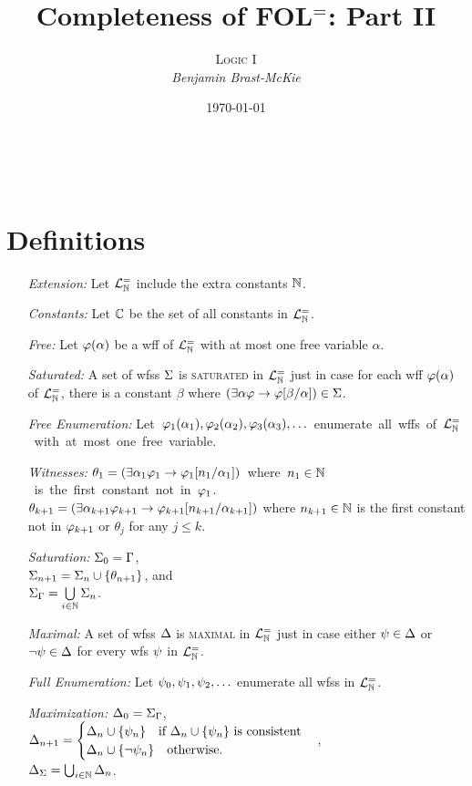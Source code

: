 \documentclass[a4paper, 11pt]{article} %
\title{\textbf{Completeness of FOL$^=$: Part II}} %
\author{\textsc{Logic I}\\ \em Benjamin Brast-McKie} %
\date{\today} %
\makeatletter
\renewcommand{\maketitle}{
\begin{flushright}
{\LARGE\@title}

\vspace{10pt}

{\@author}
\\ \@date
\end{flushright}

\vspace{-20pt}

}
\makeatother
\begin{document}
\maketitle %

\thispagestyle{empty}


\section*{Definitions}

\begin{itemize}
  \item[\it Extension:] Let $\mathcal{L}^{=}_{\mathbb{N}}$ include the extra constants $\mathbb{N}$.
  \item[\it Constants:] Let $\mathbb{C}$ be the set of all constants in $\mathcal{L}^{=}_{\mathbb{N}}$.
  \item[\it Free:] Let $\varphi(\alpha)$ be a wff of $\mathcal{L}^{=}_{\mathbb{N}}$ with at most one free variable $\alpha$.
  \item[\it Saturated:] A set of wfss $\Sigma$ is \textsc{saturated} in $\mathcal{L}^{=}_{\mathbb{N}}$ just in case for each wff $\varphi(\alpha)$ of $\mathcal{L}^{=}_{\mathbb{N}}$, there is a constant $\beta$ where $(\exists \alpha\varphi \rightarrow \varphi[\beta/\alpha])\in\Sigma$.
  \item[\it Free Enumeration:] \mbox{Let $\varphi_1(\alpha_1),\varphi_2(\alpha_2),\varphi_3(\alpha_3),\ldots$ enumerate all wffs of $\mathcal{L}^{=}_{\mathbb{N}}$ with at most one free variable.}
  \item[\it Witnesses:] \mbox{$\theta_1=(\exists \alpha_1\varphi_1\rightarrow \varphi_1[n_1/\alpha_1])$ where $n_1\in\mathbb{N}$ is the first constant not in $\varphi_1$.}\vspace{.05in}\\
    $\theta_{k+1}=(\exists \alpha_{k+1}\varphi_{k+1}\rightarrow \varphi_{k+1}[n_{k+1}/\alpha_{k+1}])$  where $n_{k+1}\in\mathbb{N}$ is the first constant not in $\varphi_{k+1}$ or $\theta_j$ for any $j\leq k$.
  \item[\it Saturation:]
    $\Sigma_0 = \Gamma$,\\
    $\Sigma_{n+1} = \Sigma_n\cup\lbrace\theta_{n+1}\rbrace$, and\\
    $\Sigma_{\Gamma} = \bigcup\limits_{i\in\mathbb{N}}\Sigma_n$.
  \item[\it Maximal:] A set of wfss $\Delta$ is \textsc{maximal} in $\mathcal{L}^{=}_{\mathbb{N}}$ just in case either $\psi\in\Delta$ or $\neg\psi\in\Delta$ for every wfs $\psi$ in $\mathcal{L}^{=}_{\mathbb{N}}$.
  \item[\it Full Enumeration:] Let $\psi_0,\psi_1,\psi_2,\ldots$ enumerate all wfss in $\mathcal{L}^{=}_{\mathbb{N}}$.
  \item[\it Maximization:]
    $\Delta_0 = \Sigma_{\Gamma}$,\\ 
    $\Delta_{n+1} =
      \begin{cases}
        \Delta_n\cup\lbrace\psi_n\rbrace ~~\text{ if } \Delta_n\cup\lbrace\psi_n\rbrace \text{ is consistent}\\
        \Delta_n\cup\lbrace\neg\psi_n\rbrace ~~\text{ otherwise}.
      \end{cases}$,\\
    $\Delta_{\Sigma} = \bigcup_{i\in\mathbb{N}}\Delta_n$. 
\end{itemize}
\end{document}
